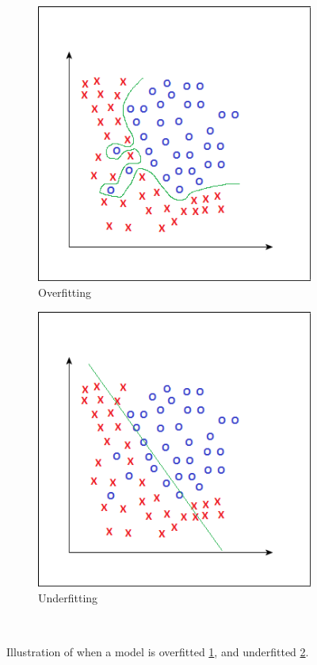 \documentclass[USenglish]{ifimaster}  %
\begin{document}
	\begin{figure}[h]
		\begin{subfigure}{0.5\linewidth}
			\centering
			\includegraphics[scale=0.4]{Figures/Overfitting}
			\caption{Overfitting}
			\label{fig:over}
		\end{subfigure}%
		\begin{subfigure}{.5\linewidth}
			\centering
			\includegraphics[scale=0.4]{Figures/Underfitting}
			\caption{Underfitting}
			\label{fig:under}
		\end{subfigure}\\[1ex]
	
		\caption[Illustration of when a model is overfitted, and underfitted]{Illustration of when a model is overfitted \ref{fig:over}, and underfitted \ref{fig:under}.}
		\label{fig:fitting}	
	\end{figure}
	\FloatBarrier
	
\end{document}
